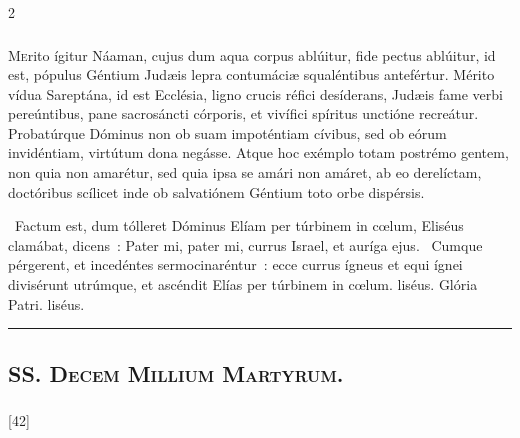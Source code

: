 \documentclass[9pt,twoside]{extarticle}
\begin{document}
\begin{multicols}{2}
\subsubsection*{\center {}}
\lettrine{M}erito ígitur Náaman, cujus dum aqua corpus ablúitur, fide pectus ablúitur, id est, pópulus Géntium Judæis lepra contumáciæ squaléntibus antefértur. Mérito vídua Sareptána, id est Ecclésia, ligno crucis réfici desíderans, Judæis fame verbi pereúntibus, pane sacrosáncti córporis, et vivífici spíritus unctióne recreátur. Probatúrque Dóminus non ob suam impoténtiam cívibus, sed ob eórum invidéntiam, virtútum dona negásse. Atque hoc exémplo totam postrémo gentem, non quia non amarétur, sed quia ipsa se amári non amáret, ab eo derelíctam, doctóribus scílicet inde ob salvatiónem Géntium toto orbe dispérsis.

\begin{tightlist}{}
\item {}~Factum est, dum tólleret Dóminus Elíam per túrbinem in cœlum, \textred{*} Eliséus clamábat, dicens~: Pater mi, pater mi, currus Israel, et auríga ejus. ~Cumque pérgerent, et incedéntes sermocinaréntur~: ecce currus ígneus et equi ígnei divisérunt utrúmque, et ascéndit Elías per túrbinem in cœlum. liséus. Glória Patri. liséus.
\item {}
\end{tightlist}

\begin{center}\textcolor{red}{\rule{\linewidth}{0.5pt}} \end{center}

\subsection*{\center {}}
\subsection*{\center \textsc{SS. Decem Millium Martyrum.}}
\subsubsection*{\center {}}

\begin{tightlist}{}
\item {} [42] 
\end{tightlist}


\end{multicols}
\end{document}
